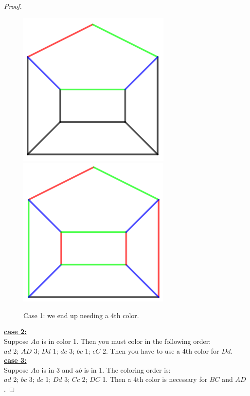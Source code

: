 \documentclass[12pt]{article}
\begin{document}
\begin{proof}
    \begin{figure}[h]
        \centering
        \caption{Case 1: we end up needing a 4th color.}
        \includegraphics[scale=0.3]{tex_images/case_1_1.png}
        \includegraphics[scale=0.3]{tex_images/case_1_2.png}
    \end{figure}

    \textbf{\underline{case 2:}} \\
    Suppose $Aa$ is in color 1. Then you must color in the following order: \\
    $ad$ 2; $AD$ 3; $Dd$ 1; $dc$ 3; $bc$ 1; $cC$ 2. Then you have to use a 4th color for $Dd$.\\

    \textbf{\underline{case 3:}} \\
    Suppose $Aa$ is in 3 and $ab$ is in 1. The coloring order is:\\
    $ad$ 2; $bc$ 3; $dc$ 1; $Dd$ 3; $Cc$ 2; $DC$ 1. Then a 4th color is necessary for $BC$ and $AD$. 

    
\end{proof}
\end{document}
